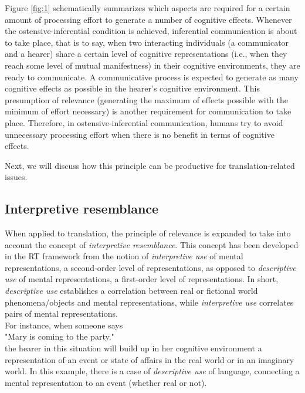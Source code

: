 \documentclass[output=paper]{langsci/langscibook}
\begin{document}
Figure \ref{fig:1} schematically summarizes which aspects are required for a certain amount of processing effort to generate a number of cognitive effects. Whenever the ostensive-inferential condition is achieved, inferential communication is about to take place, that is to say, when two interacting individuals (a communicator and a hearer) share a certain level of cognitive representations (i.e., when they reach some level of mutual manifestness) in their cognitive environments, they are ready to communicate. A communicative process is expected to generate as many cognitive effects as possible in the hearer’s cognitive environment. This presumption of relevance (generating the maximum of effects possible with the minimum of effort necessary) is another requirement for communication to take place. Therefore, in ostensive-inferential communication, humans try to avoid unnecessary processing effort when there is no benefit in terms of cognitive effects.



Next, we will discuss how this principle can be productive for translation-related issues.


\subsection{Interpretive resemblance}

When applied to translation, the principle of relevance is expanded to take into account the concept of \textit{interpretive resemblance}. This concept has been developed in the RT framework from the notion of \textit{interpretive use} of mental representations, a second-order level of representations, as opposed to \textit{descriptive use }of mental representations, a first-order level of representations. In short, \textit{descriptive use }establishes a correlation between real or fictional world phenomena/objects and mental representations, while \textit{interpretive use} correlates pairs of mental representations.\\

For instance, when someone says \\

"Mary is coming to the party."\\

the hearer in this situation will build up in her cognitive environment a representation of an event or state of affairs in the real world or in an imaginary world. In this example, there is a case of \textit{descriptive use} of language, connecting a mental representation to an event (whether real or not).\\
\end{document}

